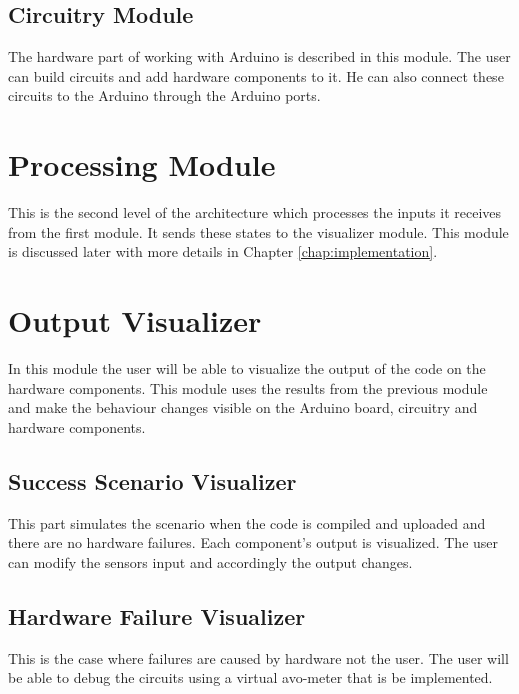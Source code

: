 \subsection{Circuitry Module}
The hardware part of working with Arduino is described in this module. The user can build circuits and add hardware components to it. He can also connect these circuits to the Arduino through the Arduino ports.

\section{Processing Module}
This is the second level of the architecture which processes the inputs it receives from the first module. It sends these states to the visualizer module. This module is discussed later with more details in Chapter \ref{chap:implementation}.

\section{Output Visualizer}
In this module the user will be able to visualize the output of the code on the hardware components. This module uses the results from the previous module and make the behaviour changes visible on the Arduino board, circuitry and hardware components.

\subsection{Success Scenario Visualizer}
This part simulates the scenario when the code is compiled and uploaded and there are no hardware failures. Each component’s output is visualized. The user can modify the sensors input and accordingly the output changes.

\subsection{Hardware Failure Visualizer}
This is the case where failures are caused by hardware not the user. The user will be able to debug the circuits using a virtual avo-meter that is be implemented.


